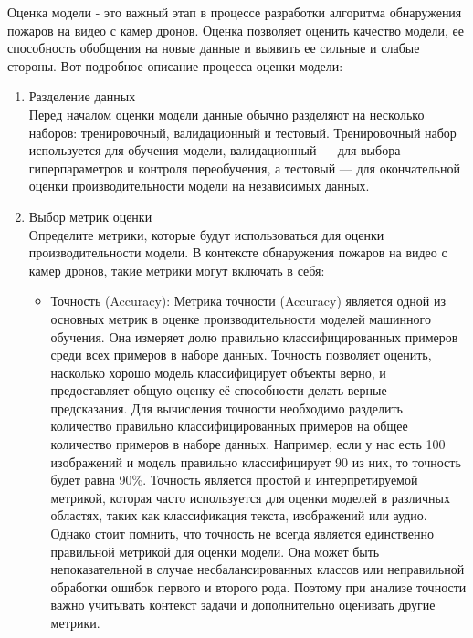     Оценка модели - это важный этап в процессе разработки алгоритма обнаружения пожаров на видео с камер дронов. Оценка позволяет оценить качество модели, ее способность обобщения на новые данные и выявить ее сильные и слабые стороны. Вот подробное описание процесса оценки модели:
    \begin{enumerate}
        \item Разделение данных \\
        Перед началом оценки модели данные обычно разделяют на несколько наборов: тренировочный, валидационный и тестовый. Тренировочный набор используется для обучения модели, валидационный — для выбора гиперпараметров и контроля переобучения, а тестовый — для окончательной оценки производительности модели на независимых данных.
        
        \item Выбор метрик оценки \\
        Определите метрики, которые будут использоваться для оценки производительности модели. В контексте обнаружения пожаров на видео с камер дронов, такие метрики могут включать в себя:
        \begin{itemize}
            \item Точность (Accuracy): Метрика точности (Accuracy) является одной из основных метрик в оценке производительности моделей машинного обучения. Она измеряет долю правильно классифицированных примеров среди всех примеров в наборе данных. Точность позволяет оценить, насколько хорошо модель классифицирует объекты верно, и предоставляет общую оценку её способности делать верные предсказания. Для вычисления точности необходимо разделить количество правильно классифицированных примеров на общее количество примеров в наборе данных. Например, если у нас есть 100 изображений и модель правильно классифицирует 90 из них, то точность будет равна 90\%. Точность является простой и интерпретируемой метрикой, которая часто используется для оценки моделей в различных областях, таких как классификация текста, изображений или аудио. Однако стоит помнить, что точность не всегда является единственно правильной метрикой для оценки модели. Она может быть непоказательной в случае несбалансированных классов или неправильной обработки ошибок первого и второго рода. Поэтому при анализе точности важно учитывать контекст задачи и дополнительно оценивать другие метрики.
            

\end{itemize}
\end{enumerate}
